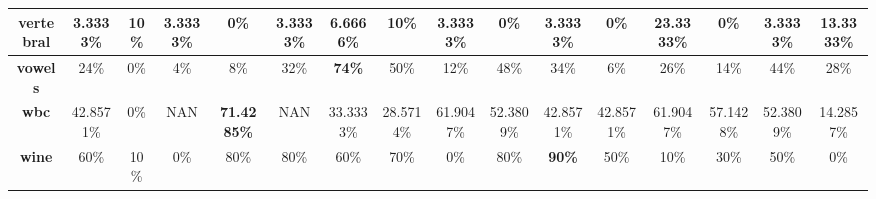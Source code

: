 \begin{table}[H]
{\begin{tabular}{|c|c|c|c|c|c|c|c|c|c|c|c|c|c|c|c|}
		\textbf{vertebral}        & 3.3333\%           & 10\%               & 3.3333\%        & 0\%                & 3.3333\%      & 6.6666\%           & 10\%               & 3.3333\%           & 0\%          & 3.3333\%           & 0\%                & \textbf{23.3333\%} & 0\%                & 3.3333\%           & 13.3333\%    \\ \hline
		\textbf{vowels}           & 24\%               & 0\%                & 4\%             & 8\%                & 32\%          & \textbf{74\%}      & 50\%               & 12\%               & 48\%         & 34\%               & 6\%                & 26\%               & 14\%               & 44\%               & 28\%         \\ \hline
		\textbf{wbc}              & 42.8571\%          & 0\%                & NAN             & \textbf{71.4285\%} & NAN           & 33.3333\%          & 28.5714\%          & 61.9047\%          & 52.3809\%    & 42.8571\%          & 42.8571\%          & 61.9047\%          & 57.1428\%          & 52.3809\%          & 14.2857\%    \\ \hline
		\textbf{wine}             & 60\%               & 10\%               & 0\%             & 80\%               & 80\%          & 60\%               & 70\%               & 0\%                & 80\%         & \textbf{90\%}      & 50\%               & 10\%               & 30\%               & 50\%               & 0\%          \\ \hline
	\end{tabular}
}
\end{table}